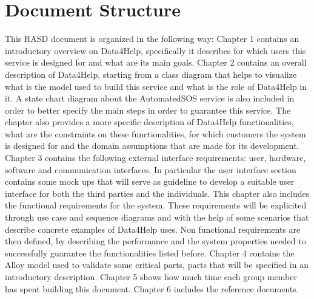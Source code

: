 \section{Document Structure}
This RASD document is organized in the following way:
Chapter 1 contains an introductory overview on Data4Help, specifically it describes for which users this service is designed for and what are its main goals.
\givespace
Chapter 2 contains an overall description of Data4Help, starting from a class diagram that helps to visualize what is the model used to build this service and what is the role of Data4Help in it. A state chart diagram about the AutomatedSOS service is also included in order to better specify the main steps in order to guarantee this service. The chapter also provides a more specific description of Data4Help functionalities, what are the constraints on these functionalities, for which customers the system is designed for and the domain assumptions that are made for its development.
\givespace
Chapter 3 contains the following external interface requirements: user, hardware, software and communication interfaces. In particular the user interface section contains some mock ups that will serve as guideline to develop a suitable user interface for both the third parties and the individuals. 
This chapter also includes the functional requirements for the system. These requirements will be explicited through use case and sequence diagrams and with the help of some scenarios that describe concrete examples of Data4Help uses.
Non functional requirements are then defined, by describing the performance and the system properties needed to successfully guarantee the functionalities listed before.
\givespace
Chapter 4 contains the Alloy model used to validate some critical parts, parts that will be specified in an introductory description.
\givespace
Chapter 5 shows how much time each group member has spent building this document.
\givespace
Chapter 6 includes the reference documents.